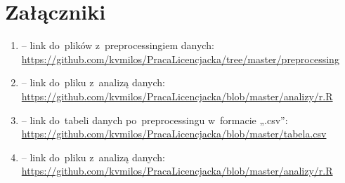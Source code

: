 \documentclass[licencjacka]{pracamgr_Kogni}
\begin{document}
    \chapter*{Załączniki}

    \begin{enumerate}
        \item{ -- link do~plików z~preprocessingiem danych: \url{https://github.com/kvmilos/PracaLicencjacka/tree/master/preprocessing}
            \label {zal:a}}
        \item{ -- link do~pliku z~analizą danych: \url{https://github.com/kvmilos/PracaLicencjacka/blob/master/analizy/r.R}
            \label {zal:b}}
        \item{ -- link do~tabeli danych po~preprocessingu w~formacie „.csv”: \url{https://github.com/kvmilos/PracaLicencjacka/blob/master/tabela.csv}
            \label {zal:c}}
        \item{ -- link do~pliku z~analizą danych: \url{https://github.com/kvmilos/PracaLicencjacka/blob/master/analizy/r.R}
            \label {zal:d}}
    \end{enumerate}
\end{document}
